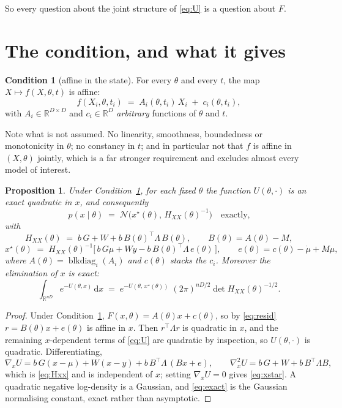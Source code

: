 \documentclass[11pt]{article}
\newcommand{\R}{\mathbb{R}}
\newcommand{\Hxx}{H_{\!X\!X}}
\newcommand{\xstar}{x^{\star}}
\theoremstyle{plain}
\newtheorem{proposition}{Proposition}
\theoremstyle{definition}
\newtheorem{condition}{Condition}
\theoremstyle{remark}
\begin{document}
So every question about the joint structure of \eqref{eq:U} is a question about $F$.

\section{The condition, and what it gives}
\label{sec:prop}

\begin{condition}[affine in the state]
\label{cond:A}
For every $\theta$ and every $t$, the map $X \mapsto f(X, \theta, t)$ is affine:
\[
  f(X_i, \theta, t_i) \;=\; A_i(\theta, t_i)\, X_i \;+\; c_i(\theta, t_i),
\]
with $A_i \in \R^{D\times D}$ and $c_i \in \R^{D}$ \emph{arbitrary} functions of $\theta$ and $t$.
\end{condition}

Note what is not assumed. No linearity, smoothness, boundedness or monotonicity in $\theta$; no
constancy in $t$; and in particular not that $f$ is affine in $(X,\theta)$ jointly, which is a far
stronger requirement and excludes almost every model of interest.

\begin{proposition}
\label{prop:main}
Under Condition~\ref{cond:A}, for each fixed $\theta$ the function $U(\theta,\cdot)$ is an exact
quadratic in $x$, and consequently
\[
  p(x \mid \theta) \;=\; \mathcal N\big(\xstar(\theta),\, \Hxx(\theta)^{-1}\big)
  \quad\text{exactly,}
\]
with
\begin{equation}
\label{eq:Hxx}
  \Hxx(\theta) \;=\; b\,G + W + b\, B(\theta)^\top \Lambda\, B(\theta),
  \qquad B(\theta) = A(\theta) - M,
\end{equation}
\begin{equation}
\label{eq:xstar}
  \xstar(\theta) \;=\; \Hxx(\theta)^{-1}\big[\, b\,G\mu + Wy - b\,B(\theta)^\top \Lambda\, e(\theta)\,\big],
  \qquad e(\theta) = c(\theta) - \dot\mu + M\mu,
\end{equation}
where $A(\theta) = \operatorname{blkdiag}_i(A_i)$ and $c(\theta)$ stacks the $c_i$. Moreover the
elimination of $x$ is exact:
\begin{equation}
\label{eq:exact}
  \int_{\R^{nD}} e^{-U(\theta,x)}\,\mathrm{d}x
  \;=\; e^{-U(\theta,\,\xstar(\theta))}\;(2\pi)^{nD/2} \det \Hxx(\theta)^{-1/2}.
\end{equation}
\end{proposition}

\begin{proof}
Under Condition~\ref{cond:A}, $F(x,\theta) = A(\theta)x + c(\theta)$, so by \eqref{eq:resid}
$r = B(\theta)x + e(\theta)$ is affine in $x$. Then $r^\top\Lambda r$ is quadratic in $x$, and the
remaining $x$-dependent terms of \eqref{eq:U} are quadratic by inspection, so $U(\theta,\cdot)$ is
quadratic. Differentiating,
\[
  \nabla_x U = b\,G(x-\mu) + W(x-y) + b\,B^\top\Lambda\,(Bx + e),
  \qquad
  \nabla^2_x U = b\,G + W + b\,B^\top\Lambda B,
\]
which is \eqref{eq:Hxx} and is independent of $x$; setting $\nabla_x U = 0$ gives
\eqref{eq:xstar}. A quadratic negative log-density is a Gaussian, and \eqref{eq:exact} is the
Gaussian normalising constant, exact rather than asymptotic.
\end{proof}
\end{document}
